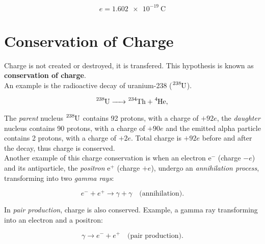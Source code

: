 \documentclass[letterpaper,12pt]{article}
\begin{document}
\begin{equation}
	e = \SI{1.602e-19}{\coulomb}
\end{equation}

\section{Conservation of Charge}

Charge is not created or destroyed, it is transfered. This hypothesis is known as \textbf{conservation of charge}.
\\
An example is the radioactive decay of uranium-238 ($\ce{^{238}_{}U}$).

\begin{equation}
	\ce{^{238}_{}U -> ^{234}_{}Th + ^{4}_{}He,}
\end{equation}

The \textit{parent} nucleus $\ce{^{238}_{}U}$ contains 92 protons, with a charge of $+92e$, the \textit{daughter} nucleus  contains 90 protons, with a charge of $+90e$ and the emitted alpha particle  contains 2 protons, with a charge of $+2e$. Total charge is $+92e$ before and after the decay, thus charge is conserved.
\\
Another example of this charge conservation is when an electron $\mathrm{e}^-$ (charge $-e$) and its antiparticle, the \textit{positron} $\mathrm{e}^+$ (charge $+e$), undergo an \textit{annihilation process}, transforming into two \textit{gamma rays}:

\begin{equation}
	e^- + e^+ \longrightarrow \gamma + \gamma \quad \text{(annihilation).}
\end{equation}

In \textit{pair production}, charge is also conserved. Example, a gamma ray transforming into an electron and a positron:

\begin{equation}
	\gamma \longrightarrow e^- + e^+ \quad \text{(pair production).}
\end{equation}
\end{document}
